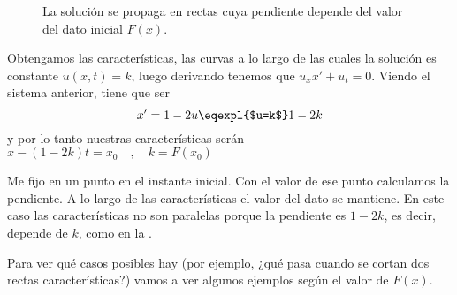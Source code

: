 		\begin{wrapfigure}{R}{0.4\textwidth}
			\centering
			\vspace{-15pt}
			\vspace{-15pt}
			\caption{La solución se propaga en rectas cuya pendiente depende del valor del dato inicial $F(x)$.}
			\label{fig:rectasDivergentes}
		\end{wrapfigure}

		Obtengamos las características, las curvas a lo largo de las cuales la solución es constante $u(x,t) = k$, luego derivando tenemos que $u_x x' + u_t = 0$. Viendo el sistema anterior, tiene que ser
		\[ x' = 1 - 2u \eqexpl{$u=k$} 1 - 2k \] y por lo tanto nuestras características serán
		\( x - (1-2k)t = x_0\quad,\quad k=F(x_0)  \label{eq:caracteristicas_realistas} \)

		Me fijo en un punto en el instante inicial. Con el valor de ese punto calculamos la pendiente. A lo largo de las características el valor del dato se mantiene. En este caso las características no son paralelas porque la pendiente es $1-2k$, es decir, depende de $k$, como en la .

		Para ver qué casos posibles hay (por ejemplo, ¿qué pasa cuando se cortan dos rectas características?) vamos a ver algunos ejemplos según el valor de $F(x)$.

